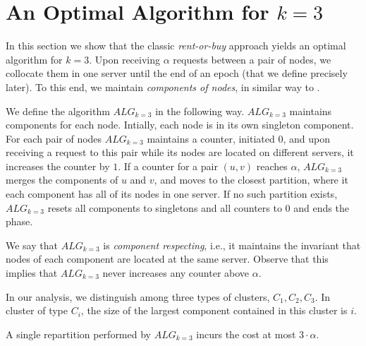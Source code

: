 \documentclass[manuscript,screen=true]{acmart}
\newcommand{\TAlg}{{\ensuremath{ALG_{k=3}}}\xspace} %
\newcommand\maciek[1]{\color{brown}\textbf{\\ Maciek: #1}\color{black}}
\begin{document}
\section{An Optimal Algorithm for $k=3$}

In this section we show that the classic \emph{rent-or-buy} approach yields an optimal algorithm for $k=3$.
Upon receiving $\alpha$ requests between a pair of nodes, we collocate them in one server until the end of an epoch (that we define precisely later).
To this end, we maintain \emph{components of nodes}, in similar way to \cite{repartition-disc}.


We define the algorithm \TAlg{} in the following way.
\TAlg{} maintains components for each node.
Intially, each node is in its own singleton component.
For each pair of nodes \TAlg{} maintains a counter, initiated $0$, and upon receiving a request to this pair while its nodes are located on different servers, it increases the counter by $1$.
If a counter for a pair $(u,v)$ reaches $\alpha$, \TAlg{} merges the components of $u$ and $v$, and moves to the closest partition, where it each component has all of its nodes in one server.
If no such partition exists, \TAlg{} resets all components to singletons and all counters to $0$ and ends the phase.


We say that \TAlg is \emph{component respecting}, i.e., it maintains the invariant that nodes of each component are located at the same server.
Observe that this implies that \TAlg never increases any counter above $\alpha$.

In our analysis, we distinguish among three types of clusters, $C_1, C_2, C_3$. In cluster of type $C_i$, the size of the largest component contained in this cluster is $i$.

\begin{lemma}
  \label{lem:1req}
  A single repartition performed by \TAlg{} incurs the cost at most $3\cdot\alpha$.
\end{lemma}
\end{document}

